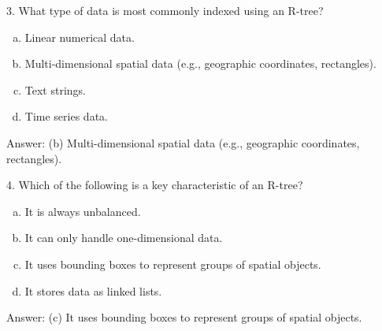 \documentclass{article}
\begin{document}
\begin{question}{3. What type of data is most commonly indexed using an R-tree?}
	\begin{enumerate}[(a)]
		\item Linear numerical data.
		\item Multi-dimensional spatial data (e.g., geographic coordinates, rectangles).
		\item Text strings.
		\item Time series data.
	\end{enumerate}
\end{question}
Answer: (b) Multi-dimensional spatial data (e.g., geographic coordinates, rectangles).

\begin{question}{4. Which of the following is a key characteristic of an R-tree?}
	\begin{enumerate}[(a)]
		\item It is always unbalanced.
		\item It can only handle one-dimensional data.
		\item It uses bounding boxes to represent groups of spatial objects.
		\item It stores data as linked lists.
	\end{enumerate}
\end{question}
Answer: (c) It uses bounding boxes to represent groups of spatial objects.

\printbibliography
\end{document}
